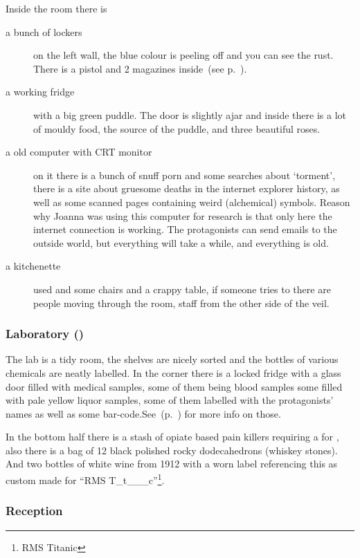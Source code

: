 Inside the room there is
\begin{description}
  \item[a bunch of lockers] on the left wall, the blue colour is peeling off and you can see the rust.  There is a pistol and 2
        magazines inside~(see p.~\pageref{pistol}).
  \item[a working fridge] with a big green puddle.  The door is slightly ajar and inside there is a lot of mouldy food,
        the source of the puddle, and three beautiful roses.
  \item[a old computer with CRT monitor] on it there is a bunch of snuff porn and some searches about ‘torment’, there is a
        site about gruesome deaths in the internet explorer history, as well as some scanned pages containing weird (alchemical)
        symbols.  Reason why Joanna was using this computer for research is that only here the internet connection is working.  The
        protagonists can send emails to the outside world, but everything will take a while, and everything is old.
  \item[a kitchenette] used and some chairs and a crappy table, if someone tries to 
        there are people moving through the room, staff from the other side of the veil.
\end{description}

\subsubsection{Laboratory (\faLock)}%
\label{ssub:laboratory}

The lab is a tidy room, the shelves are nicely sorted and the bottles of various chemicals are neatly labelled.  In the corner there
is a locked fridge with a glass door filled with medical samples, some of them being blood samples some filled with pale yellow liquor
samples, some of them labelled with the protagonists' names as well as some bar-code.See~(p.~\pageref{ssub:vials}) for more info on those.

In the bottom half there is a stash of opiate based pain killers requiring a  for , also
there is a bag of 12 black polished rocky dodecahedrons (whiskey stones).  And two bottles of white wine from 1912 with a worn label
referencing this as custom made for “RMS T\_t\_\_\_c”\footnote{RMS Titanic}.

\subsubsection{Reception}%
\label{ssub:reception}


